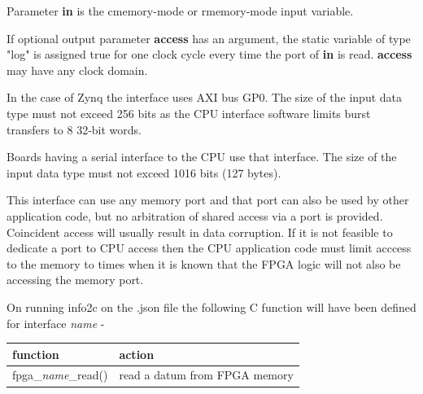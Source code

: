             Parameter {\bf in} is the cmemory-mode or rmemory-mode input variable.
            
            If optional output parameter {\bf access} has an argument, the
            static variable of type "log" is assigned true for one clock cycle
            every time the port of {\bf in} is read. {\bf access} may have any
            clock domain.
            
            In the case of Zynq the interface uses AXI bus GP0.            
            The size of the input data type must not exceed 256 bits as the CPU
            interface software limits burst transfers to 8 32-bit words.
            
            Boards having a serial interface to the CPU use that interface.
            The size of the input data type must not exceed 1016 bits (127 bytes).
            
            This interface can use any memory port and that port can also be
            used by other application code, but no arbitration of shared access
            via a port is provided. Coincident access will usually result in
            data corruption. If it is not feasible to dedicate a port to CPU
            access then the CPU application code must limit acccess to the
            memory to times when it is known that the FPGA logic will not also
            be accessing the memory port.
            
            On running info2c on the .json file the following C function will have been
            defined for interface {\em name} -
            
            \begin{tabular}{| l | l |}
            \hline
            function                 & action                         \\ \hline \hline
            fpga\_{\em name}\_read() & read a datum from FPGA memory  \\ \hline
            \end{tabular}
            
